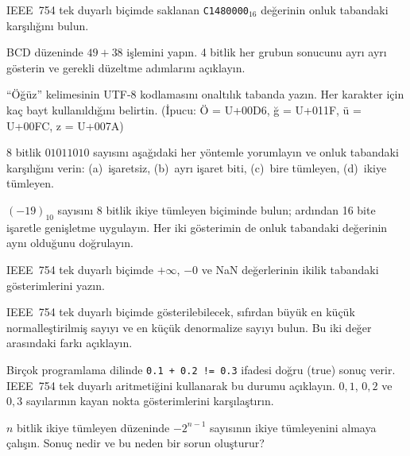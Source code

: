\begin{alistirma}[\orta]
IEEE~754 tek duyarlı biçimde saklanan \texttt{C1480000}$_{16}$ değerinin onluk tabandaki karşılığını bulun.
\end{alistirma}

\begin{alistirma}[\orta]
BCD düzeninde $49 + 38$ işlemini yapın. 4 bitlik her grubun sonucunu ayrı ayrı gösterin ve gerekli düzeltme adımlarını açıklayın.
\end{alistirma}

\begin{alistirma}[\orta]
``Öğüz'' kelimesinin UTF-8 kodlamasını onaltılık tabanda yazın. Her karakter için kaç bayt kullanıldığını belirtin. (İpucu: Ö = U+00D6, ğ = U+011F, ü = U+00FC, z = U+007A)
\end{alistirma}

\begin{alistirma}[\orta]
8 bitlik $01011010$ sayısını aşağıdaki her yöntemle yorumlayın ve onluk tabandaki karşılığını verin: (a)~işaretsiz, (b)~ayrı işaret biti, (c)~bire tümleyen, (d)~ikiye tümleyen.
\end{alistirma}

\begin{alistirma}[\orta]
$(-19)_{10}$ sayısını 8 bitlik ikiye tümleyen biçiminde bulun; ardından 16 bite işaretle genişletme uygulayın. Her iki gösterimin de onluk tabandaki değerinin aynı olduğunu doğrulayın.
\end{alistirma}

\begin{alistirma}[\zor]
IEEE~754 tek duyarlı biçimde $+\infty$, $-0$ ve NaN değerlerinin ikilik tabandaki gösterimlerini yazın.
\end{alistirma}

\begin{alistirma}[\zor]
IEEE~754 tek duyarlı biçimde gösterilebilecek, sıfırdan büyük en küçük normalleştirilmiş sayıyı ve en küçük denormalize sayıyı bulun. Bu iki değer arasındaki farkı açıklayın.
\end{alistirma}

\begin{alistirma}[\zor]
Birçok programlama dilinde \texttt{0.1 + 0.2 != 0.3} ifadesi doğru (true) sonuç verir. IEEE~754 tek duyarlı aritmetiğini kullanarak bu durumu açıklayın. $0{,}1$, $0{,}2$ ve $0{,}3$ sayılarının kayan nokta gösterimlerini karşılaştırın.
\end{alistirma}

\begin{alistirma}[\zor]
$n$ bitlik ikiye tümleyen düzeninde $-2^{n-1}$ sayısının ikiye tümleyenini almaya çalışın. Sonuç nedir ve bu neden bir sorun oluşturur?
\end{alistirma}
